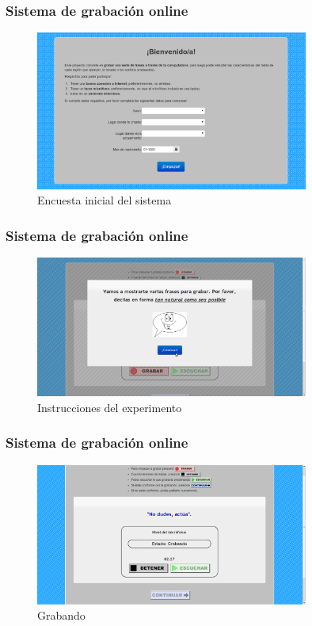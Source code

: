 \documentclass[mathserif]{beamer}%
\begin{document}
\begin{frame}
	\frametitle{Sistema de grabación online}
	
	\begin{figure}[h!]
		\centerline{\includegraphics[width=0.8\textwidth]{pag-inicio2} }
		\caption{Encuesta inicial del sistema}
		\label{figEncuesta}
	\end{figure}
\end{frame}

\begin{frame}
	\frametitle{Sistema de grabación online}
	
	\begin{figure}[h!]
		\centerline{\includegraphics[width=0.8\textwidth]{pag-info2} }
		\caption{Instrucciones del experimento}
		\label{figInstrucciones}
	\end{figure}
\end{frame}

\begin{frame}
	\frametitle{Sistema de grabación online}
	
	\begin{figure}[h!]
		\centerline{\includegraphics[width=0.8\textwidth]{pag-grabar1} }
		\caption{Grabando}
		\label{figEncuesta}
	\end{figure}
\end{frame}
\end{document}
